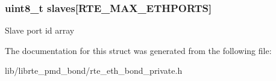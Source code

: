 \subsubsection[{slaves}]{\setlength{\rightskip}{0pt plus 5cm}uint8\+\_\+t slaves\mbox{[}R\+T\+E\+\_\+\+M\+A\+X\+\_\+\+E\+T\+H\+P\+O\+R\+T\+S\mbox{]}}\label{structbond__ethdev__slave__ports_aabe27a69cb59cc9e6a45c0f59a941cf9}
Slave port id array 

The documentation for this struct was generated from the following file\+:\begin{DoxyCompactItemize}
\item 
lib/librte\+\_\+pmd\+\_\+bond/rte\+\_\+eth\+\_\+bond\+\_\+private.\+h\end{DoxyCompactItemize}
